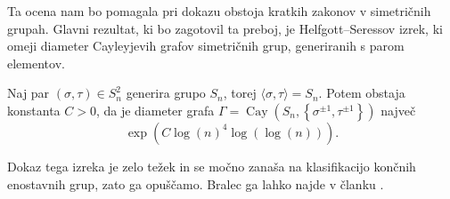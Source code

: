 Ta ocena nam bo pomagala pri dokazu obstoja kratkih zakonov v simetričnih grupah.
Glavni rezultat, ki bo zagotovil ta preboj, je Helfgott--Seressov izrek, ki omeji diameter Cayleyjevih grafov simetričnih grup, generiranih s parom elementov. \begin{izrek}\label{izr_Helfgott_Seress}
Naj par $(\sigma, \tau) \in S_n^2$ generira grupo $S_n$, torej $\langle \sigma, \tau \rangle = S_n$. Potem obstaja konstanta $C > 0$, da je diameter grafa $\Gamma = \operatorname{Cay}(S_n, \left\{ \sigma^{\pm 1}, \tau^{\pm 1} \right\} )$ največ 
\begin{equation*}
\exp(C \log(n)^{4} \log(\log(n))).
\end{equation*}
\end{izrek}  
Dokaz tega izreka je zelo težek in se močno zanaša na klasifikacijo končnih enostavnih grup, zato ga opuščamo. Bralec ga lahko najde v članku \cite{Helfgott_Seress_2013}.
